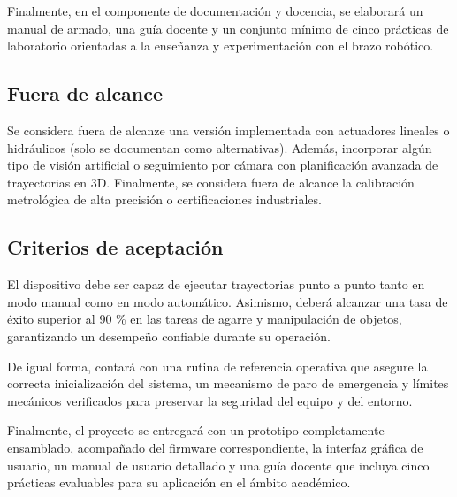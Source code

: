 Finalmente, en el componente de documentación y docencia, se elaborará un manual de armado, una guía docente y un conjunto mínimo de cinco prácticas de laboratorio orientadas a la enseñanza y experimentación con el brazo robótico.


\subsection{Fuera de alcance}
Se considera fuera de alcanze una versión implementada con actuadores lineales o hidráulicos (solo se documentan como alternativas). Además, incorporar algún tipo de visión artificial o seguimiento por cámara con planificación avanzada de trayectorias en 3D. Finalmente, se considera fuera de alcance la calibración metrológica de alta precisión o certificaciones industriales.


\subsection{Criterios de aceptación}
El dispositivo debe ser capaz de ejecutar trayectorias punto a punto tanto en modo manual como en modo automático. Asimismo, deberá alcanzar una tasa de éxito superior al 90 \% en las tareas de agarre y manipulación de objetos, garantizando un desempeño confiable durante su operación.

De igual forma, contará con una rutina de referencia operativa que asegure la correcta inicialización del sistema, un mecanismo de paro de emergencia y límites mecánicos verificados para preservar la seguridad del equipo y del entorno.

Finalmente, el proyecto se entregará con un prototipo completamente ensamblado, acompañado del firmware correspondiente, la interfaz gráfica de usuario, un manual de usuario detallado y una guía docente que incluya cinco prácticas evaluables para su aplicación en el ámbito académico.